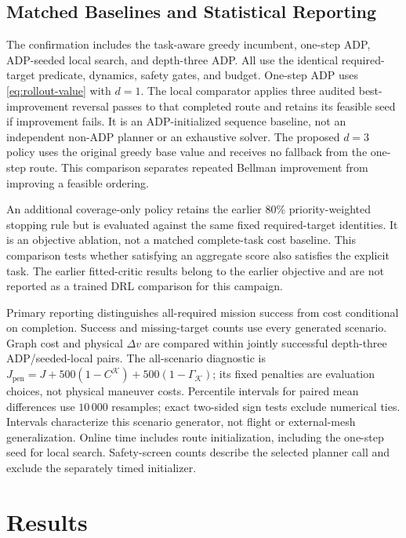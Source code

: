 \subsection{Matched Baselines and Statistical Reporting}

The confirmation includes the task-aware greedy incumbent, one-step ADP, ADP-seeded local search, and depth-three ADP. All use the identical required-target predicate, dynamics, safety gates, and budget. One-step ADP uses \eqref{eq:rollout-value} with $d=1$. The local comparator applies three audited best-improvement reversal passes to that completed route and retains its feasible seed if improvement fails. It is an ADP-initialized sequence baseline, not an independent non-ADP planner or an exhaustive solver. The proposed $d=3$ policy uses the original greedy base value and receives no fallback from the one-step route. This comparison separates repeated Bellman improvement from improving a feasible ordering.

An additional coverage-only policy retains the earlier 80\% priority-weighted stopping rule but is evaluated against the same fixed required-target identities. It is an objective ablation, not a matched complete-task cost baseline. This comparison tests whether satisfying an aggregate score also satisfies the explicit task. The earlier fitted-critic results belong to the earlier objective and are not reported as a trained DRL comparison for this campaign.

Primary reporting distinguishes all-required mission success from cost conditional on completion. Success and missing-target counts use every generated scenario. Graph cost and physical $\Delta v$ are compared within jointly successful depth-three ADP/seeded-local pairs. The all-scenario diagnostic is $J_{\mathrm{pen}}=J+500(1-C^{\mathcal K})+500(1-\Gamma_{\mathcal K})$; its fixed penalties are evaluation choices, not physical maneuver costs. Percentile intervals for paired mean differences use $10\,000$ resamples; exact two-sided sign tests exclude numerical ties. Intervals characterize this scenario generator, not flight or external-mesh generalization. Online time includes route initialization, including the one-step seed for local search. Safety-screen counts describe the selected planner call and exclude the separately timed initializer.

\section{Results}
\label{sec:results}

